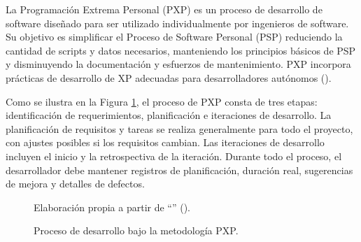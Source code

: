 La Programación Extrema Personal (PXP) es un proceso de desarrollo de software diseñado para ser utilizado individualmente por ingenieros de software. Su objetivo es simplificar el Proceso de Software Personal (PSP) reduciendo la cantidad de scripts y datos necesarios, manteniendo los principios básicos de PSP y disminuyendo la documentación y esfuerzos de mantenimiento. PXP incorpora prácticas de desarrollo de XP adecuadas para desarrolladores autónomos (\cite{dzhurov2009personal}). 

\indent
Como se ilustra en la Figura \ref{fig:modelo_desarrollo_pxp}, el proceso de PXP consta de tres etapas: identificación de requerimientos, planificación e iteraciones de desarrollo. La planificación de requisitos y tareas se realiza generalmente para todo el proyecto, con ajustes posibles si los requisitos cambian. Las iteraciones de desarrollo incluyen el inicio y la retrospectiva de la iteración. Durante todo el proceso, el desarrollador debe mantener registros de planificación, duración real, sugerencias de mejora y detalles de defectos.

\begin{figure}[htb]
	\centering
    
    \caption{Proceso de desarrollo bajo la metodología PXP.}
    \footnotesize{{Elaboración propia a partir de ``\textit{}'' (\citeyear{dzhurov2009personal}).}}
	\label{fig:modelo_desarrollo_pxp} 
\end{figure}

